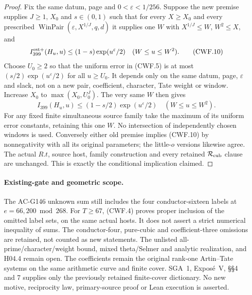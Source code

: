 \begin{proof}
Fix the same datum, page and $0<\varepsilon<1/256$.
Suppose the new premise supplies $J\geq1$, $X_0$ and $s\in(0,1)$
such that for every $X\geq X_0$ and every prescribed
$\operatorname{WinPair}(\varepsilon,X^{1/J},q,d)$ it supplies one
$W$ with $X^{1/J}\leq W$, $W^2\leq X$, and
\[
 I_{399}^{\rm est+}(H_u,u)\leq(1-s)\exp(u^\varepsilon/2)
                           \quad(W\leq u\leq W^2).
 \tag{CWF.10}
\]
Choose $U_0\geq2$ so that the uniform error in (CWF.5) is at most
$(s/2)\exp(u^\varepsilon/2)$ for all $u\geq U_0$.
It depends only on the same datum, page, $\varepsilon$ and slack,
not on a new pair, coefficient, character, Tate weight or window.
Increase $X_0$ to $\max(X_0,U_0^J)$.  The very same $W$ then gives
\[
 I_{399}(H_u,u)\leq(1-s/2)\exp(u^\varepsilon/2)
                              \quad(W\leq u\leq W^2).
 \tag{CWF.11}
\]
For any fixed finite simultaneous source family take the maximum
of its uniform error constants, retaining this one $W$.
No intersection of independently chosen windows is used.
Conversely either old premise implies (CWF.10) by nonnegativity
with all its original parameters; the little-$o$ versions likewise
agree.  The actual $R.t$, source host, family construction and
every retained $\mathcal R_{\rm cub}$ clause are unchanged.
This is exactly the conditional implication claimed.
\end{proof}

\paragraph{Existing-gate and geometric scope.}
The AC-G146 unknown sum still includes the four conductor-sixteen
labels at $e=66,200\bmod268$.  For $T\geq67$, (CWF.4) proves
proper inclusion of the omitted label sets, on the same actual hosts.
It does not assert a strict numerical inequality of sums.
The conductor-four, pure-cubic and coefficient-three omissions
are retained, not counted as new statements.
The unlisted all-prime/character/weight bound, mixed theta/Selmer
and analytic realization, and H04.4 remain open.
The coefficients remain the original rank-one Artin--Tate systems
on the same arithmetic curve and finite cover.  SGA~1,
Expos\'e~V, \S\S4 and 7 supplies only the previously retained
finite-cover dictionary.  No new motive, reciprocity law,
primary-source proof or Lean execution is asserted.
